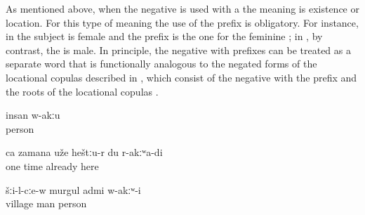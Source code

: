 As mentioned above, when the negative  is used with a   the meaning is existence or location. For this type of meaning the use of the prefix is obligatory. For instance, in  the subject is female and the  prefix is the one for the feminine ; in , by contrast, the  is male. In principle, the negative  with  prefixes can be treated as a separate word that is functionally analogous to the negated forms of the locational copulas described in , which consist of the negative  with the  prefix and the roots of the locational copulas .
%
\begin{exe}
	\ex	\label{ex:Nobody is there}
	\gll	insan	w-akːu\\
		person	\\
	\glt	{}

	\ex	\label{ex:At one time I was already not there anymore}
	\gll	ca	zamana	uže	heštːu-r	du	r-akːʷa-di\\
		one	time	already	here		\\
	\glt	{}

	\ex	\label{ex:In the village there was no man}
	\gll	šːi-l-cːe-w	murgul	admi	w-akːʷ-i\\
		village	man	person	\\
	\glt	{}
\end{exe}

